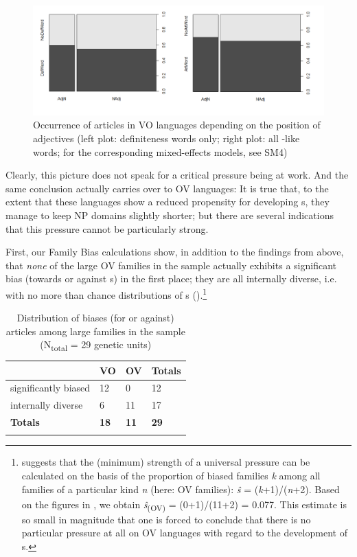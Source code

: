 \documentclass[output=paper]{langsci/langscibook}
\begin{document}
  

\begin{figure}
\includegraphics[width=\textwidth]{figures/schmidtkebode-img4.png}
\caption{Occurrence of articles in VO languages depending on the position of adjectives (left plot: definiteness words only; right plot: all -like words; for the corresponding mixed-effects models, see SM4)}
\label{fig:ksb:4}
\end{figure}

Clearly, this picture does not speak for a critical  pressure being at work. And the same conclusion actually carries over to OV languages: It is true that, to the extent that these languages show a reduced propensity for developing s, they manage to keep NP  domains slightly shorter; but there are several indications that this pressure cannot be particularly strong. 

First, our Family Bias calculations show, in addition to the findings from above, that \textit{none} of the large OV families in the sample actually exhibits a significant bias (towards or against s) in the first place; they are all internally diverse, i.e. with no more than chance distributions of s ().\footnote{\citet{Bickel2013_Fam} suggests that the (minimum) strength of a universal pressure can be calculated on the basis of the proportion of biased families \textit{k} among all families of a particular kind \textit{n} (here: OV families): \textit{\^s}\textsubscript{} =\textsubscript{} (\textit{k}+1)/(\textit{n}+2). Based on the figures in , we obtain \textit{\^s}\textsubscript{(OV)} = (0+1)/(11+2) = 0.077. This estimate is so small in magnitude that one is forced to conclude that there is no particular pressure at all on OV languages with regard to the development of s.} 

\begin{table}
\begin{tabularx}{.8\textwidth}{lYYY}
\lsptoprule
& VO & OV &  Totals\\
\midrule
significantly biased & 12 & 0 & 12\\
internally diverse & 6 & 11 & 17\\
\midrule
\textbf{Totals} & \textbf{18} & \textbf{11} & \textbf{29}\\
\lspbottomrule
\end{tabularx}
\caption{Distribution of biases (for or against) articles among large families in the sample (N\textsubscript{total} = 29 genetic units)}
\label{tab:ksb:4}
\end{table}
\end{document}
